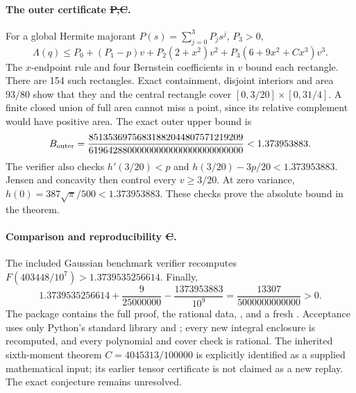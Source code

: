 \paragraph{The outer certificate \st{P,C}.}
For a global Hermite majorant $P(s)=\sum_{j=0}^3P_js^j$, $P_3>0$,
\[
 \Lambda(q)\le P_0+(P_1-p)v+P_2(2+x^2)v^2
                            +P_3(6+9x^2+Cx^3)v^3.
\]
The $x$-endpoint rule and four Bernstein coefficients in $v$ bound each
rectangle. There are 154 such rectangles. Exact containment, disjoint
interiors and area $93/80$ show that they and the central rectangle
cover $[0,3/20]\times[0,31/4]$. A finite closed union of full area cannot
miss a point, since its relative complement would have positive area.
The exact outer upper bound is
\[
 B_{\rm outer}=
 \frac{85135369756831882044807571219209}
      {61964288000000000000000000000000}
 <1.373953883.
\]
The verifier also checks $h'(3/20)<p$ and
$h(3/20)-3p/20<1.373953883$.
Jensen and concavity then control every $v\ge3/20$.
At zero variance, $h(0)=387\sqrt\pi/500<1.373953883$.
These checks prove the absolute bound in the theorem.

\paragraph{Comparison and reproducibility \st{C}.}
The included Gaussian benchmark verifier recomputes
$F(403448/10^7)>1.3739535256614$. Finally,
\[
 1.3739535256614+\frac9{25000000}
             -\frac{1373953883}{10^9}
 =\frac{13307}{5000000000000}>0.
\]
The package  contains the full proof,
the rational data, , and a fresh .
Acceptance uses only Python's standard library and ;
every new integral enclosure is recomputed, and every polynomial and
cover check is rational. The inherited sixth-moment theorem
$C=4045313/100000$ is explicitly identified as a supplied mathematical
input; its earlier tensor certificate is not claimed as a new replay.
The exact conjecture remains unresolved.
